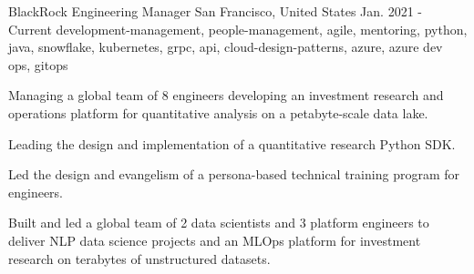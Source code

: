 \cventry
    {BlackRock} %
    {Engineering Manager} %
    {San Francisco, United States} %
    {Jan. 2021 - Current} %
    { development-management, people-management, agile, mentoring, python, java, snowflake, kubernetes, grpc, api, cloud-design-patterns, azure, azure dev ops, gitops} %
    {
    \begin{cvitems} %
       \item {Managing a global team of 8 engineers developing an investment research and operations platform for quantitative analysis on a petabyte-scale data lake. }
       \item {Leading the design and implementation of a quantitative research Python SDK. }
       \item {Led the design and evangelism of a persona-based technical training program for engineers. }
       \item {Built and led a global team of 2 data scientists and 3 platform engineers to deliver NLP data science projects and an MLOps platform for investment research on terabytes of unstructured datasets. }
    \end{cvitems}
    }

